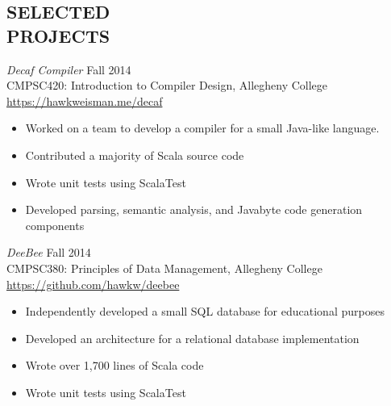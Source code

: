 \documentclass[margin]{res}
\begin{document}
\begin{resume}
                \pagebreak
\section{SELECTED \\ PROJECTS}

        {\sl Decaf Compiler} \hfill Fall 2014 \\
                CMPSC420: Introduction to Compiler Design, Allegheny College \\ 
        \url{https://hawkweisman.me/decaf}
        \begin{itemize} \itemsep -2pt %
        \item Worked on a team to develop a compiler for a small Java-like language.
        \item Contributed a majority of Scala source code
        \item Wrote unit tests using ScalaTest
        \item Developed parsing, semantic analysis, and Javabyte code generation components
        \end{itemize}
        
        {\sl DeeBee} \hfill Fall 2014 \\
                CMPSC380: Principles of Data Management, Allegheny College \\ 
        \url{https://github.com/hawkw/deebee}
        \begin{itemize} \itemsep -2pt %
        \item Independently developed a small SQL database for educational purposes
        \item Developed an architecture for a relational database implementation
        \item Wrote over 1,700 lines of Scala code
        \item Wrote unit tests using ScalaTest
        \end{itemize}
        

\end{resume}
\end{document}
